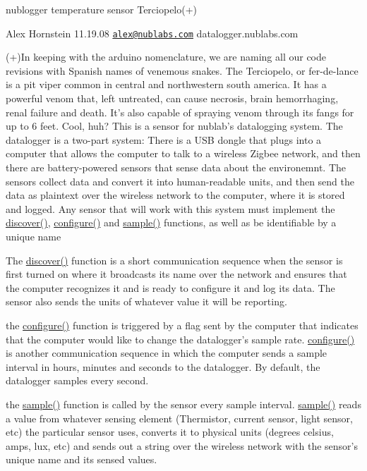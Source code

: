 nublogger temperature sensor Terciopelo(+)

Alex Hornstein 11.19.08 \href{mailto:alex@nublabs.com}{\tt alex@nublabs.com} datalogger.nublabs.com

(+)In keeping with the arduino nomenclature, we are naming all our code revisions with Spanish names of venemous snakes. The Terciopelo, or fer-de-lance is a pit viper common in central and northwestern south america. It has a powerful venom that, left untreated, can cause necrosis, brain hemorrhaging, renal failure and death. It's also capable of spraying venom through its fangs for up to 6 feet. Cool, huh? This is a sensor for nublab's datalogging system. The datalogger is a two-part system: There is a USB dongle that plugs into a computer that allows the computer to talk to a wireless Zigbee network, and then there are battery-powered sensors that sense data about the environemnt. The sensors collect data and convert it into human-readable units, and then send the data as plaintext over the wireless network to the computer, where it is stored and logged. Any sensor that will work with this system must implement the \hyperlink{nublogger_8h_3fdb2350c3f98c0de0f0ae3c831a8b14}{discover()}, \hyperlink{nublogger_8h_e369b3765489ee8bd0ea791c1843630f}{configure()} and \hyperlink{temperature__sensor___terciopelo_8pde_50a2ce599e896bfb535e70a42003ed23}{sample()} functions, as well as be identifiable by a unique name

The \hyperlink{nublogger_8h_3fdb2350c3f98c0de0f0ae3c831a8b14}{discover()} function is a short communication sequence when the sensor is first turned on where it broadcasts its name over the network and ensures that the computer recognizes it and is ready to configure it and log its data. The sensor also sends the units of whatever value it will be reporting.

the \hyperlink{nublogger_8h_e369b3765489ee8bd0ea791c1843630f}{configure()} function is triggered by a flag sent by the computer that indicates that the computer would like to change the datalogger's sample rate. \hyperlink{nublogger_8h_e369b3765489ee8bd0ea791c1843630f}{configure()} is another communication sequence in which the computer sends a sample interval in hours, minutes and seconds to the datalogger. By default, the datalogger samples every second.

the \hyperlink{temperature__sensor___terciopelo_8pde_50a2ce599e896bfb535e70a42003ed23}{sample()} function is called by the sensor every sample interval. \hyperlink{temperature__sensor___terciopelo_8pde_50a2ce599e896bfb535e70a42003ed23}{sample()} reads a value from whatever sensing element (Thermistor, current sensor, light sensor, etc) the particular sensor uses, converts it to physical units (degrees celsius, amps, lux, etc) and sends out a string over the wireless network with the sensor's unique name and its sensed values.

